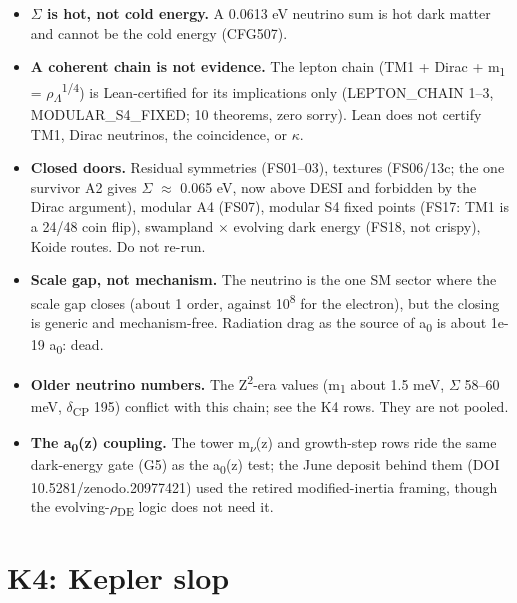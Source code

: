 \documentclass[10pt]{article}
\begin{document}
\begin{itemize}

\item \textbf{\ensuremath{\Sigma} is hot, not cold energy.} A 0.0613 eV neutrino sum is hot dark matter and cannot be the cold energy (CFG507).

\item \textbf{A coherent chain is not evidence.} The lepton chain (TM1 + Dirac + m\textsubscript{1} = \ensuremath{\rho}\textsubscript{\ensuremath{\Lambda}}\textsuperscript{1/4}) is Lean-certified for its implications only (LEPTON\_CHAIN 1--3, MODULAR\_S4\_FIXED; 10 theorems, zero sorry). Lean does not certify TM1, Dirac neutrinos, the coincidence, or \ensuremath{\kappa}.

\item \textbf{Closed doors.} Residual symmetries (FS01--03), textures (FS06/13c; the one survivor A2 gives \ensuremath{\Sigma} \ensuremath{\approx} 0.065 eV, now above DESI and forbidden by the Dirac argument), modular A4 (FS07), modular S4 fixed points (FS17: TM1 is a 24/48 coin flip), swampland \ensuremath{\times} evolving dark energy (FS18, not crispy), Koide routes. Do not re-run.

\item \textbf{Scale gap, not mechanism.} The neutrino is the one SM sector where the scale gap closes (about 1 order, against 10\textsuperscript{8} for the electron), but the closing is generic and mechanism-free. Radiation drag as the source of a\textsubscript{0} is about 1e-19 a\textsubscript{0}: dead.

\item \textbf{Older neutrino numbers.} The Z\textsuperscript{2}-era values (m\textsubscript{1} about 1.5 meV, \ensuremath{\Sigma} 58--60 meV, \ensuremath{\delta}\textsubscript{CP} 195\textdegree{}) conflict with this chain; see the K4 rows. They are not pooled.

\item \textbf{The a\textsubscript{0}(z) coupling.} The tower m\textsubscript{\ensuremath{\nu}}(z) and growth-step rows ride the same dark-energy gate (G5) as the a\textsubscript{0}(z) test; the June deposit behind them (DOI 10.5281/zenodo.20977421) used the retired modified-inertia framing, though the evolving-\ensuremath{\rho}\textsubscript{DE} logic does not need it.

\end{itemize}

\section{K4: Kepler slop}
\end{document}
